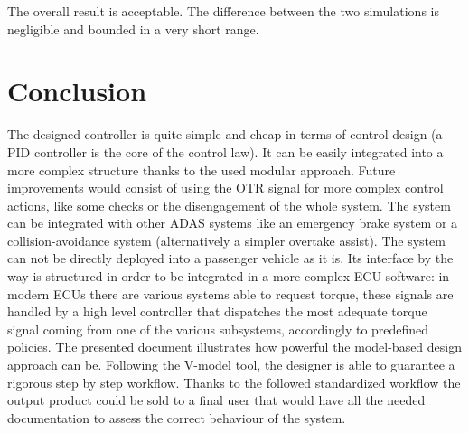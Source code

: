 \documentclass[12pt,a4paper]{report}
\begin{document}
The overall result is acceptable.
The difference between the two simulations is negligible and bounded in a very short range.

\chapter{Conclusion}
The designed controller is quite simple and cheap in terms of control design (a PID controller is the core of the control law). It can be easily integrated into a more complex structure thanks to the used modular approach. 
Future improvements would consist of using the OTR signal for more complex control actions, like some checks or the disengagement of the whole system.
The system can be integrated with other ADAS systems like an emergency brake system or a collision-avoidance system (alternatively a simpler overtake assist).
The system can not be directly deployed into a passenger vehicle as it is. Its interface by the way is structured in order to be integrated in a more complex ECU software: in modern ECUs there are various systems able to request torque, these signals are handled by a high level controller that dispatches the most adequate torque signal coming from one of the various subsystems, accordingly to predefined policies. 
The presented document illustrates how powerful the model-based design approach can be. Following the V-model tool, the designer is able to guarantee a rigorous step by step workflow.
Thanks to the followed standardized workflow the output product could be sold to a final user that would have all the needed documentation to assess the correct behaviour of the system.






	
\end{document}
